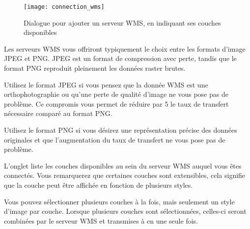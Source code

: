 \begin{figure}[ht]
\centering
\texttt{[image: connection\_wms]}
\caption{Dialogue pour ajouter un serveur WMS, en indiquant ses couches
disponibles \nixcaption}\label{fig:connection_wms}
\end{figure}

\begin{Tip}[ht]\caption{\textsc{Format d'image}}

Les serveurs WMS vous offriront typiquement le choix entre les formats d'image 
JPEG et PNG. JPEG est un format de compression avec perte, tandis que le format 
PNG reproduit pleinement les données raster brutes.

Utilisez le format JPEG si vous pensez que la donnée WMS est une orthophotographie 
ou qu'une perte de qualité d'image ne vous pose pas de problème. Ce compromis 
vous permet de réduire par 5 le taux de transfert nécessaire comparé au  format PNG.

Utilisez le format PNG si vous désirez une représentation précise des données 
originales et que l'augmentation du taux de transfert ne vous pose pas de 
problème.
\end{Tip}

 \label{ogc-wms-layers}

L'onglet  liste les couches disponibles au sein du serveur 
WMS auquel vous êtes connectés. 
Vous remarquerez que certaines couches sont extensibles, cela signifie que 
la couche peut être affichée en fonction de plusieurs styles.

Vous pouvez sélectionner plusieurs couches à la fois, mais seulement un style  d'image par couche. Lorsque plusieurs couches sont sélectionnées, celles-ci  seront combinées par le serveur WMS et transmises à \qg en une seule fois.

